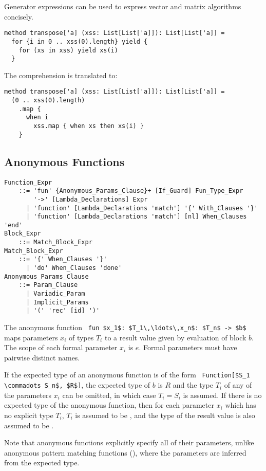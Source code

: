 \example Generator expressions can be used to express vector and matrix algorithms concisely.
\begin{lstlisting}
method transpose['a] (xss: List[List['a]]): List[List['a]] =
  for {i in 0 .. xss(0).length} yield {
    for (xs in xss) yield xs(i)
  }
\end{lstlisting} 
The comprehension is translated to: 
\begin{lstlisting}
method transpose['a] (xss: List[List['a]]): List[List['a]] = 
  (0 .. xss(0).length)
    .map { 
      when i 
        xss.map { when xs then xs(i) }
    }
\end{lstlisting}






\subsection{Anonymous Functions}
\label{sec:anonymous-functions}

\grammar\begin{lstlisting}
Function_Expr
    ::= 'fun' {Anonymous_Params_Clause}+ [If_Guard] Fun_Type_Expr
        '->' [Lambda_Declarations] Expr
      | 'function' [Lambda_Declarations 'match'] '{' With_Clauses '}'
      | 'function' [Lambda_Declarations 'match'] [nl] When_Clauses 'end'
Block_Expr
    ::= Match_Block_Expr
Match_Block_Expr
    ::= '{' When_Clauses '}'
      | 'do' When_Clauses 'done'
Anonymous_Params_Clause
    ::= Param_Clause
      | Variadic_Param
      | Implicit_Params
      | '(' 'rec' [id] ')'
\end{lstlisting}

The anonymous function ~\lstinline!fun $x_1$: $T_1\,\ldots\,x_n$: $T_n$ -> $b$!~ maps parameters $x_i$ of types $T_i$ to a result value given by evaluation of block $b$. The scope of each formal parameter $x_i$ is $e$. Formal parameters must have pairwise distinct names.

If the expected type of an anonymous function is of the form ~\lstinline!Function[$S_1 \commadots S_n$, $R$]!, the expected type of $b$ is $R$ and the type $T_i$ of any of the parameters $x_i$ can be omitted, in which case $T_i = S_i$ is assumed. If there is no expected type of the anonymous function, then for each parameter $x_i$ which has no explicit type $T_i$, $T_i$ is assumed to be , and the type of the result value is also assumed to be . 

Note that anonymous functions explicitly specify all of their parameters, unlike anonymous pattern matching functions (), where the parameters are inferred from the expected type. 

